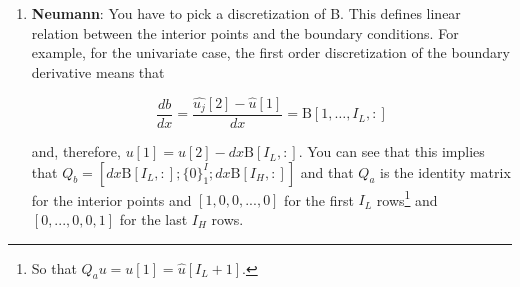 \documentclass[11pt]{article}
\begin{document}
\begin{itemize}
\begin{enumerate}
		\item \textbf{Neumann}: You have to pick a discretization of B. 
		This defines linear relation between the interior points and the boundary conditions. For example, for the univariate case, the first order discretization of the boundary derivative means that 
		
		\begin{equation}
			\frac{db}{dx} = \frac{\hat{u_j}[2] - \hat{u}[1]}{dx} = \text{B}[1,\dots,I_{L},:]
		\end{equation}
		
		and, therefore, $u[1] = u[2] - dx\text{B}[I_L,:]$. You can see that this implies that $Q_b = [dx\text{B}[I_L,:];\{0\}_1^I;dx \text{B}[I_H,:]]$ and that $Q_a$ is the identity matrix for the interior points and $[1,0, 0,...,0]$ for the first $I_L$ rows\footnote{So that $Q_a u = u[1] = \hat{u}[I_L+1]$.} and $[0,...,0,0,1]$ for the last $I_H$ rows.%
		
	\end{enumerate}
\end{itemize}
\fi
\end{document}
